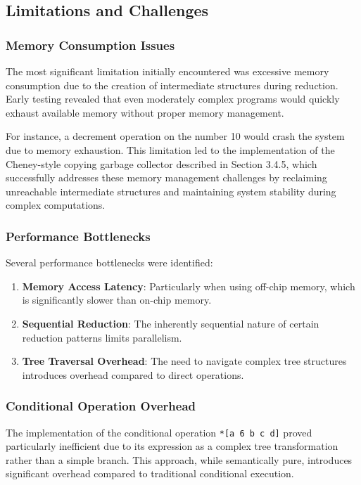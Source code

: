 \documentclass[twoside]{article}
\begin{document}
\subsection{Limitations and Challenges}

\subsubsection{Memory Consumption Issues}

The most significant limitation initially encountered was excessive memory consumption due to the creation of intermediate structures during reduction. Early testing revealed that even moderately complex programs would quickly exhaust available memory without proper memory management.

For instance, a decrement operation on the number 10 would crash the system due to memory exhaustion. This limitation led to the implementation of the Cheney-style copying garbage collector described in Section 3.4.5, which successfully addresses these memory management challenges by reclaiming unreachable intermediate structures and maintaining system stability during complex computations.

\subsubsection{Performance Bottlenecks}

Several performance bottlenecks were identified:

\begin{enumerate}
  \item \textbf{Memory Access Latency}: Particularly when using off-chip memory, which is significantly slower than on-chip memory.
  \item \textbf{Sequential Reduction}: The inherently sequential nature of certain reduction patterns limits parallelism.
  \item \textbf{Tree Traversal Overhead}: The need to navigate complex tree structures introduces overhead compared to direct operations.
\end{enumerate}

\subsubsection{Conditional Operation Overhead}

The implementation of the conditional operation \texttt{*[a 6 b c d]} proved particularly inefficient due to its expression as a complex tree transformation rather than a simple branch. This approach, while semantically pure, introduces significant overhead compared to traditional conditional execution.
\end{document}

